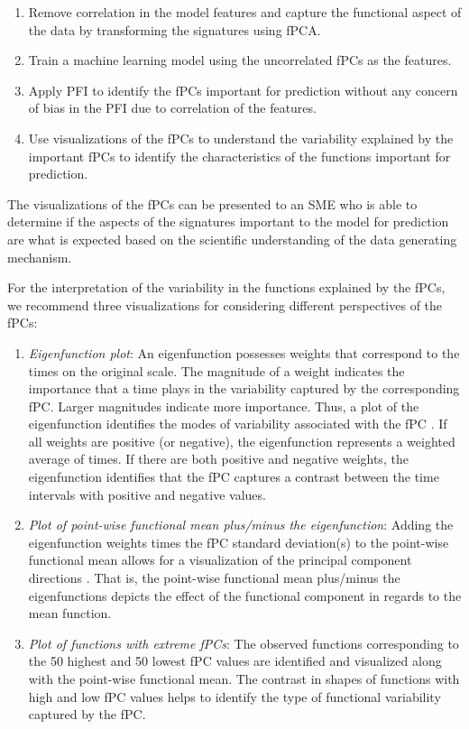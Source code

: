 \documentclass[letterpaper]{article}
\begin{document}
\begin{enumerate}
\item Remove correlation in the model features and capture the functional aspect of the data by transforming the signatures using fPCA.
\item Train a machine learning model using the uncorrelated fPCs as the features.
\item Apply PFI to identify the fPCs important for prediction without any concern of bias in the PFI due to correlation of the features.
\item Use visualizations of the fPCs to understand the variability explained by the important fPCs to identify the characteristics of the functions important for prediction.
\end{enumerate}

The visualizations of the fPCs can be presented to an SME who is able to determine if the aspects of the signatures important to the model for prediction are what is expected based on the scientific understanding of the data generating mechanism.

For the interpretation of the variability in the functions explained by the fPCs, we recommend three visualizations for considering different perspectives of the fPCs:

\begin{enumerate}
\item \textit{Eigenfunction plot}: An eigenfunction possesses weights that correspond to the times on the original scale. The magnitude of a weight indicates the importance that a time plays in the variability captured by the corresponding fPC. Larger magnitudes indicate more importance. Thus, a plot of the eigenfunction identifies the modes of variability associated with the fPC \cite{ramsay:2005}. If all weights are positive (or negative), the eigenfunction represents a weighted average of times. If there are both positive and negative weights, the eigenfunction identifies that the fPC captures a contrast between the time intervals with positive and negative values. 
\item \textit{Plot of point-wise functional mean plus/minus the eigenfunction}: Adding the eigenfunction weights times the fPC standard deviation(s) to the point-wise functional mean allows for a visualization of the principal component directions \cite{ramsay:2005}. That is, the point-wise functional mean plus/minus the eigenfunctions depicts the effect of the functional component in regards to the mean function.
\item \textit{Plot of functions with extreme fPCs}: The observed functions corresponding to the 50 highest and 50 lowest fPC values are identified and visualized along with the point-wise functional mean. The contrast in shapes of functions with high and low fPC values helps to identify the type of functional variability captured by the fPC.
\end{enumerate}
\end{document}
